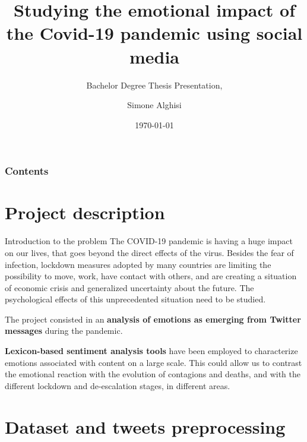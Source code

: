 \documentclass[8pt]{beamer}  %
\title{Studying the emotional impact of the Covid-19 pandemic using social media}
\subtitle{Bachelor Degree Thesis Presentation, \textattachfile{Template.tex}{(TeX)}} %
\author{Simone Alghisi}
\institute{Università degli Studi di Trento}
\date[\today]{\today}
\begin{document}
\frame{\titlepage} %

\setcounter{tocdepth}{1}

\begin{frame}
    \frametitle{Contents}
    \tableofcontents
\end{frame}

\setlength{\abovedisplayskip}{0pt}
\setlength{\belowdisplayskip}{0pt}
\setlength{\abovedisplayshortskip}{0pt}
\setlength{\belowdisplayshortskip}{0pt}  %

\section{Project description}
\begin{frame}{Introduction to the problem}
The COVID-19 pandemic is having a huge impact on our lives, that goes beyond the direct effects of the virus. Besides the fear of infection, lockdown measures adopted by many countries are limiting the possibility to move, work, have contact with others, and are creating a situation of economic crisis and generalized uncertainty about the future. The psychological effects of this unprecedented situation need to be studied.

The project consisted in an \textbf{analysis of emotions as emerging from Twitter messages} during the pandemic.

\textbf{Lexicon-based sentiment analysis tools} have been employed to characterize emotions associated with content on a large scale. This could allow us to contrast the emotional reaction with the evolution of contagions and deaths, and
with the different lockdown and de-escalation stages, in different areas.

\end{frame}

\section{Dataset and tweets preprocessing}
\end{document}
